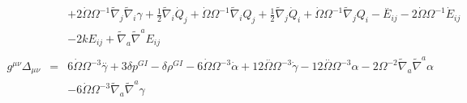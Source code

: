 \documentclass[10pt,letterpaper]{article}
\numberwithin{equation}{section}
\begin{document}
\begin{eqnarray}
&& + 2 \dot{\Omega} \Omega^{-1} \tilde{\nabla}_{j}\tilde{\nabla}_{i}\gamma +\tfrac{1}{2} \tilde{\nabla}_{i}\dot{Q}_{j} + \dot{\Omega} \Omega^{-1} \tilde{\nabla}_{i}Q_{j} + \tfrac{1}{2} \tilde{\nabla}_{j}\dot{Q}_{i} + \dot{\Omega} \Omega^{-1} \tilde{\nabla}_{j}Q_{i}- \overset{..}{E}_{ij} - 2 \dot{\Omega} \Omega^{-1} \dot{E}_{ij} \nonumber \\ 
&& - 2 k E_{ij} + \tilde{\nabla}_{a}\tilde{\nabla}^{a}E_{ij}
\\  \nonumber\\ 
g^{\mu\nu}\Delta_{\mu\nu}&=& 6 \dot{\Omega} \Omega^{-3} \overset{..}{\gamma} + 3 \delta p^{GI}{} -  \delta \rho^{GI}{} - 6 \dot{\Omega} \Omega^{-3} \dot{\alpha} + 12 \overset{..}{\Omega} \Omega^{-3} \dot{\gamma} - 12 \overset{..}{\Omega} \Omega^{-3} \alpha - 2 \Omega^{-2} \tilde{\nabla}_{a}\tilde{\nabla}^{a}\alpha \nonumber \\ 
&& - 6 \dot{\Omega} \Omega^{-3} \tilde{\nabla}_{a}\tilde{\nabla}^{a}\gamma 
\end{eqnarray}



\end{document}
